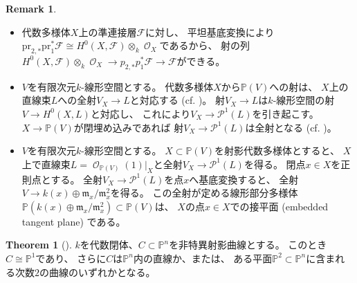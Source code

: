 \documentclass[uplatex]{jsarticle}
\theoremstyle{definition}
\newtheorem{thm}{Theorem}%
\newtheorem{rem}[rem]{Remark}
\renewcommand{\P}{\mathbb{P}}
\newcommand{\mcF}{\mathcal{F}}
\newcommand{\mcO}{\mathcal{O}}
\newcommand{\mcP}{\mathcal{P}}
\DeclareMathOperator{\OOO}{\mcO}
\newcommand{\OX}{\OOO_X}
\newcommand{\OO}[1]{\OOO_{#1}}
\newcommand{\HTMLSkip}[1]{#1}
\begin{document}
\begin{rem}
  \HTMLSkip{ \ }
  \begin{itemize}
    \item
    代数多様体\(X\)上の準連接層\(\mcF\)に対し、
    平坦基底変換により
    \(\mathrm{pr}_{2,*}\mathrm{pr}_1^*\mcF\cong H^0(X,\mcF)\otimes_k \OX\)であるから、
    射の列\(H^0(X,\mcF)\otimes_k \OX\to p_{2,*}p_1^*\mcF\to \mcF\)ができる。
    \item
    \(V\)を有限次元\(k\)-線形空間とする。
    代数多様体\(X\)から\(\P(V)\)への射は、
    \(X\)上の直線束\(L\)への全射\(V_X\to L\)と対応する
    (cf. \cite[Theorem II.7.12]{Ha})。
    射\(V_X\to L\)は\(k\)-線形空間の射\(V\to H^0(X,L)\)と対応し、
    これにより\(V_X\to \mcP^1(L)\)を引き起こす。
    \(X\to \P(V)\)が閉埋め込みであれば
    射\(V_X\to \mcP^1(L)\)は全射となる
    (cf. \cite{YJ})。
    \item
    \(V\)を有限次元\(k\)-線形空間とする。
    \(X\subset \P(V)\)を射影代数多様体とすると、
    \(X\)上で直線束\(L=\OO{\P(V)}(1)|_X\)と全射\(V_X\to \mcP^1(L)\)を得る。
    閉点\(x\in X\)を正則点とする。
    全射\(V_X\to \mcP^1(L)\)を点\(x\)へ基底変換すると、
    全射\(V\to k(x)\oplus \mathfrak{m}_x/\mathfrak{m}_x^2\)を得る。
    この全射が定める線形部分多様体
    \(\P(k(x)\oplus \mathfrak{m}_x/\mathfrak{m}_x^2)\subset \P(V)\)は、
    \(X\)の点\(x\in X\)での接平面 (embedded tangent plane) である。
  \end{itemize}
\end{rem}




\begin{thm}[{\cite[定理 IV.3.9]{Ha}}]
  \(k\)を代数閉体、\(C\subset \P^n\)を非特異射影曲線とする。
  このとき\(C\cong \P^1\)であり、
  さらに\(C\)は\(\P^n\)内の直線か、または、
  ある平面\(\P^2\subset \P^n\)に含まれる次数\(2\)の曲線のいずれかとなる。
\end{thm}
\end{document}
